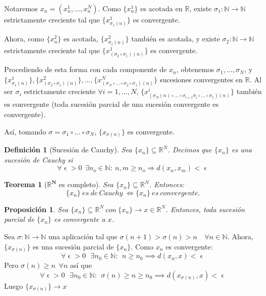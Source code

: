\documentclass[11pt, a4paper, titlepage]{article}
\makeatletter
\let\epsilon\upvarepsilon
\renewenvironment{proof}[1][\proofname] {\vspace{-15pt}\par\pushQED{\qed}\normalfont\topsep6\p@\@plus6\p@\relax\trivlist\item[\hskip\labelsep\it#1\@addpunct{.}]\ignorespaces}{\popQED\endtrivlist\@endpefalse}
\newcommand{\bm}[1]{\boldsymbol{#1}}
\theoremstyle{theorem-style}
\newtheorem*{nth}{Teorema}
\newtheorem*{nprop}{Proposición}
\theoremstyle{definition-style}
\newtheorem*{ndef}{Definición}
\theoremstyle{remark-style}
\theoremstyle{example-style}
\makeatother
\begin{document}
\begin{proof}
	Notaremos $x_n = (x_n^1, \dots, x_n^N)$. Como $\{x_n^1\}$ es acotada en $\mathbb{R}$, existe $\sigma_1 : \mathbb{N} \rightarrow \mathbb{N}$ estrictamente creciente tal que $\{x_{\sigma_1(n)}^1\}$ es convergente.

Ahora, como $\{x_n^2\}$ es acotada, $\{x_{\sigma_1(n)}^2\}$ también es acotada, y existe $\sigma_2 : \mathbb{N} \rightarrow \mathbb{N}$ estrictamente creciente tal que $\{x_{(\sigma_2\circ\sigma_1)(n)}^1\}$ es convergente.

Procediendo de esta forma con cada componente de $x_n$, obtenemos $\sigma_1, \dots, \sigma_N$, y\\ $\{x_{\sigma_1(n)}^1\}, \{x_{(\sigma_2\circ\sigma_1)(n)}^2\}, \dots, \{x_{(\sigma_N\circ\dots\circ\sigma_2\circ\sigma_1)(n)}^N\}$ sucesiones convergentes en $\mathbb{R}$. Al ser $\sigma_i$ estrictamente creciente $\forall i=1,\dots,N$, $\{x_{(\sigma_N(n)\circ\dots\circ\sigma_{i+1}\sigma_i\circ\dots\circ\sigma_1)(n)}^i\}$ también es convergente (toda sucesión parcial de una sucesión convergente es convergente).

Así, tomando $\sigma = \sigma_1\circ\dots\circ\sigma_N$, $\{x_{\sigma(n)}\}$ es convergente.
\end{proof}


\begin{ndef}[Sucesión de Cauchy]
Sea $\{x_n\}\subseteq \mathbb{R}^N$. Decimos que $\{x_n\}$ es una \textit{sucesión de Cauchy} si $$ \forall \epsilon > 0\ \ \exists n_o \in \mathbb{N}: \ n,m\ge n_o \Rightarrow d(x_n,x_m) < \epsilon$$
\end{ndef}



\begin{nth} [$\bm{\mathbb{R}^N}$ es completo]
Sea $\{x_n\}\subseteq \mathbb{R}^N$. Entonces: $$\{x_n\}\ es\ de\ Cauchy\ \iff \{x_n\}\ es\ convergente.$$
\end{nth}



\begin{nprop}
Sea $\{x_n\} \subseteq \mathbb{R}^N\ con\ \{x_n\} \rightarrow x \in \mathbb{R}^N$. Entonces, toda sucesión parcial de $\{x_n\}$ es convergente a $x$.
\end{nprop}
\begin{proof}
	Sea $\sigma :\mathbb N \to \mathbb N$ una aplicación tal que $\sigma(n+1) > \sigma(n) > n \quad \forall n \in \mathbb N$. Ahora, $\{x_{\sigma(n)}\}$ es una sucesión parcial de $\{x_n\}$. Como $x_n$ es convergente:
	\[
	\forall \epsilon > 0 \ \ \ \exists n_0 \in \mathbb N : \ \ n \geq n_0 \implies d(x_n,x) < \epsilon
	\]
	Pero $\sigma(n) \geq n \ \ \forall n$ así que
	\[
	\forall \epsilon > 0 \ \ \ \exists n_0 \in \mathbb N : \ \ \sigma(n) \geq n \geq n_0 \implies d(x_{\sigma(n)},x) < \epsilon
	\]
	Luego $\{x_{\sigma(n)}\}\to x$
\end{proof}
\end{document}

